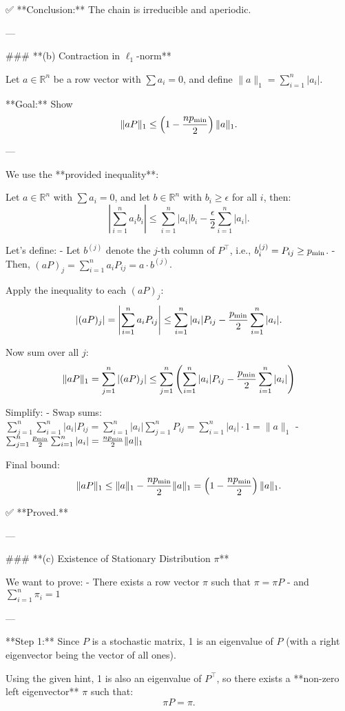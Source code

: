 \begin{enumerate}
\begin{shaded}
✅ **Conclusion:** The chain is irreducible and aperiodic.

---

### **(b) Contraction in \( \ell_1 \)-norm**

Let \( a \in \mathbb{R}^n \) be a row vector with \( \sum a_i = 0 \), and define \( \|a\|_1 = \sum_{i=1}^n |a_i| \).

**Goal:** Show
\[
\|aP\|_1 \le \left(1 - \frac{np_{\textrm{min}}}{2}\right) \|a\|_1.
\]

---

We use the **provided inequality**:

Let \( a \in \mathbb{R}^n \) with \( \sum a_i = 0 \), and let \( b \in \mathbb{R}^n \) with \( b_i \ge \epsilon \) for all \( i \), then:
\[
\left| \sum_{i=1}^n a_i b_i \right| \le \sum_{i=1}^n |a_i| b_i - \frac{\epsilon}{2} \sum_{i=1}^n |a_i|.
\]

Let's define:
- Let \( b^{(j)} \) denote the \( j \)-th column of \( P^\top \), i.e., \( b^{(j)}_i = P_{ij} \ge p_{\textrm{min}} \).
- Then, \( (aP)_j = \sum_{i=1}^n a_i P_{ij} = a \cdot b^{(j)} \).

Apply the inequality to each \( (aP)_j \):
\[
|(aP)_j| = \left| \sum_{i=1}^n a_i P_{ij} \right| \le \sum_{i=1}^n |a_i| P_{ij} - \frac{p_{\textrm{min}}}{2} \sum_{i=1}^n |a_i|.
\]

Now sum over all \( j \):
\[
\|aP\|_1 = \sum_{j=1}^n |(aP)_j| \le \sum_{j=1}^n \left(\sum_{i=1}^n |a_i| P_{ij} - \frac{p_{\textrm{min}}}{2} \sum_{i=1}^n |a_i| \right)
\]

Simplify:
- Swap sums: \( \sum_{j=1}^n \sum_{i=1}^n |a_i| P_{ij} = \sum_{i=1}^n |a_i| \sum_{j=1}^n P_{ij} = \sum_{i=1}^n |a_i| \cdot 1 = \|a\|_1 \)
- \( \sum_{j=1}^n \frac{p_{\textrm{min}}}{2} \sum_{i=1}^n |a_i| = \frac{n p_{\textrm{min}}}{2} \|a\|_1 \)

Final bound:
\[
\|aP\|_1 \le \|a\|_1 - \frac{n p_{\textrm{min}}}{2} \|a\|_1 = \left(1 - \frac{n p_{\textrm{min}}}{2} \right)\|a\|_1.
\]

✅ **Proved.**

---

### **(c) Existence of Stationary Distribution \( \pi \)**

We want to prove:
- There exists a row vector \( \pi \) such that \( \pi = \pi P \)
- and \( \sum_{i=1}^n \pi_i = 1 \)

---

**Step 1:** Since \( P \) is a stochastic matrix, 1 is an eigenvalue of \( P \) (with a right eigenvector being the vector of all ones).

Using the given hint, 1 is also an eigenvalue of \( P^\top \), so there exists a **non-zero left eigenvector** \( \pi \) such that:
\[
\pi P = \pi.
\]


\end{shaded}
\end{enumerate}
